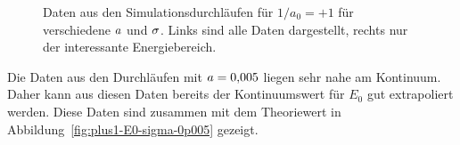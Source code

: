 \begin{figure}[htbp]
\begin{minipage}{0.49\linewidth}
    \end{minipage}
    \caption{%
        Daten aus den Simulationsdurchläufen für $1/a_0 = +1$ für verschiedene
        $a$ und $\sigma$. Links sind alle Daten dargestellt,
        rechts nur der interessante Energiebereich.
    }
    \label{fig:plus1-E0-a}
\end{figure}

Die Daten aus den Durchläufen mit $a = \num{0.005}$ liegen 
sehr nahe am Kontinuum. Daher kann aus diesen Daten bereits der Kontinuumswert
für $E_0$ gut extrapoliert werden. Diese Daten sind zusammen mit dem
Theoriewert in Abbildung~\ref{fig:plus1-E0-sigma-0p005} gezeigt.

